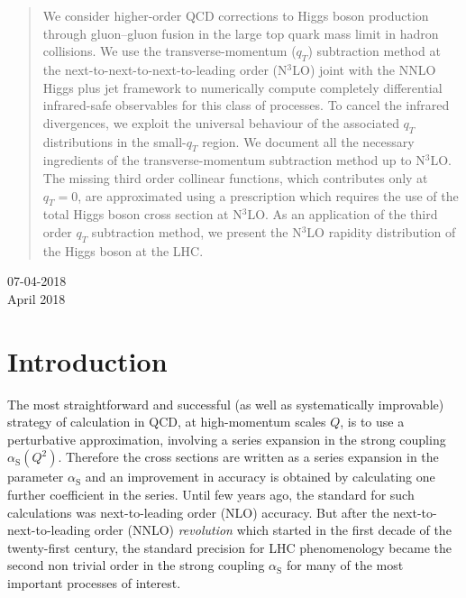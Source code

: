 \documentclass[12pt]{article}
\newcommand\as{\alpha_{\mathrm{S}}}
\begin{document}
\begin{titlepage}
\begin{quote}
We consider higher-order QCD corrections to Higgs boson production through gluon--gluon fusion in the large top quark mass limit in hadron collisions. We use the transverse-momentum ($q_T$) subtraction method at the next-to-next-to-next-to-leading order (N$^{3}$LO) joint with the NNLO Higgs plus jet framework to numerically compute completely differential infrared-safe observables for this class of processes. To cancel the infrared divergences, we exploit the universal behaviour of the associated $q_T$ distributions in the small-$q_T$ region. We document all the necessary ingredients of the transverse-momentum subtraction method up to N$^{3}$LO. The missing third order collinear functions, which contributes only at $q_{T}=0$, are approximated using a prescription which requires the use of the total Higgs boson cross section at N$^{3}$LO. As an application of the third order $q_T$ subtraction method, we present the  N$^{3}$LO rapidity distribution of the Higgs boson at the LHC.

\end{quote}
\vspace*{\fill}
\begin{flushleft}
07-04-2018  \\ April 2018
\end{flushleft}
\end{titlepage}
\setcounter{footnote}{1}
\renewcommand{\thefootnote}{\fnsymbol{footnote}}
\section{Introduction}
\label{sec:intro}
The most straightforward and successful (as well as systematically improvable) strategy of calculation in QCD, at high-momentum scales $Q$, is to use a perturbative approximation, involving a series expansion in the strong coupling $\as(Q^{2})$. Therefore the cross sections are written as a series expansion in the parameter $\as$ and an improvement in accuracy is obtained by calculating one further coefficient in the series. Until few years ago, the standard for such calculations was next-to-leading order (NLO) accuracy. But after the next-to-next-to-leading order (NNLO) \textit{revolution} which started in the first decade of the twenty-first century, the standard precision for LHC phenomenology became the second non trivial order in the strong coupling $\as$ for many of the most important processes of interest.
\end{document}
